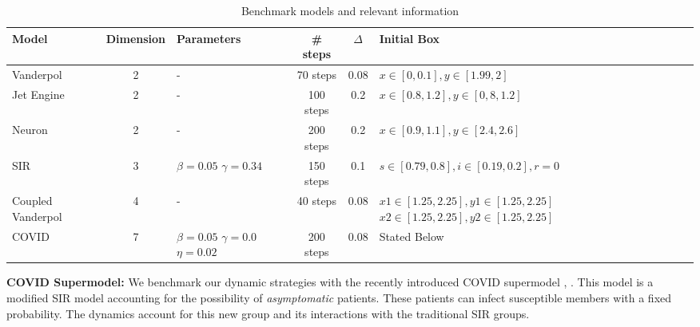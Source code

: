 \vspace{-1em}
\begin{table}[h!]
  \centering
\begin{tabular}{|p{1.5cm}|c|p{1.7cm}|c|c|p{5cm}|}
\hline
Model & Dimension & Parameters & \# steps & $\Delta$ & \hspace{1.5cm}Initial Box \\
\hline
Vanderpol & 2 & \quad \quad \; - & 70 steps & 0.08 & $x \in [0,0.1], y \in [1.99,2]$ \\
\hline
Jet Engine& 2 & \quad \quad \; - & 100 steps & 0.2 & $x \in [0.8,1.2], y \in [0,8,1.2]$ \\
\hline
Neuron \cite{fitzhugh1961impulses}& 2 & \quad \quad \; - & 200 steps & 0.2 & $x \in [0.9,1.1], y \in [2.4,2.6]$ \\
\hline
SIR& 3 & $\beta=0.05$ \newline $\gamma=0.34$ & 150 steps & 0.1 & $s \in [0.79,0.8], i \in [0.19,0.2], r = 0$ \\
\hline
Coupled \newline Vanderpol & 4 & \quad \quad \; - & 40 steps & 0.08 & $x1 \in [1.25, 2.25], y1 \in [1.25, 2.25]$ \newline $x2 \in [1.25, 2.25], y2 \in [1.25, 2.25]$ \\
\hline
COVID & 7 & $\beta=0.05$ \newline $\gamma=0.0$ \newline $\eta=0.02$ & 200 steps & 0.08 & \quad \quad \quad \; \; Stated Below\\
\hline
\end{tabular}
\caption{Benchmark models and relevant information}
\label{tab:modeldyns}
\end{table}

\vspace{-2em}
\noindent \textbf{COVID Supermodel:}
%
We benchmark our dynamic strategies with the recently introduced COVID supermodel \cite{ansumali2020modelling}, \cite{indiansuper2020supermodel}. This model is a modified SIR model accounting for the possibility of \emph{asymptomatic} patients. These patients can infect susceptible members with a fixed probability. The dynamics account for this new group and its interactions with the traditional SIR groups.

